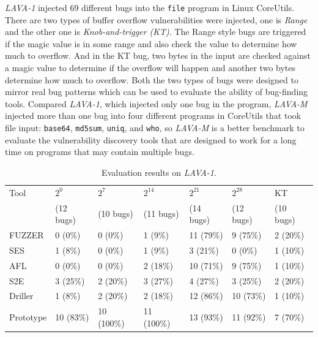 \textit{LAVA-1} injected 69 different bugs into the \texttt{file} program in Linux CoreUtils. There are two types of buffer overflow vulnerabilities were injected, one is \emph{Range} and the other one is \emph{Knob-and-trigger (KT)}. The Range style bugs are triggered if the magic value is in some range and also check the value to determine how much to overflow. And in the KT bug, two bytes in the input are checked against a magic value to determine if the overflow will happen and another two bytes determine how much to overflow. Both the two types of bugs were designed to mirror real bug patterns which can be used to evaluate the ability of bug-finding tools. Compared \textit{LAVA-1}, which injected only one bug in the program, \textit{LAVA-M} injected more than one bug into four different programs in CoreUtils that took file input: \texttt{base64}, \texttt{md5sum}, \texttt{uniq}, and \texttt{who}, so \textit{LAVA-M} is a better benchmark to evaluate the vulnerability discovery tools that are designed to work for a long time on programs that may contain multiple bugs.

\begin{table}
  \caption{\label{LAVA-1}Evaluation results on \textit{LAVA-1}.}
  \centering
	\begin{tabular}{p{2cm}<{\centering} p{1.5cm}<{\centering} p{1.6cm}<{\centering}  p{1.6cm}<{\centering}	p{1.5cm}<{\centering} p{1.5cm}<{\centering}  p{1.5cm}<{\centering} }
		\toprule
	    Tool & $2^0$ & $2^7$  & $2^{14}$ & $2^{21}$ & $2^{28}$ & KT \\
	         & (12 bugs) & (10 bugs) & (11 bugs) & (14 bugs) & (12 bugs) & (10 bugs) \\
		\midrule
		FUZZER 		& 0 (0\%)   & 0 (0\%)    & 1 (9\%)    & 11 (79\%) & 9 (75\%)  & 2 (20\%) \\
		SES	        & 1 (8\%)   & 0 (0\%)    & 1 (9\%)    & 3 (21\%)  & 0 (0\%)   & 1 (10\%) \\
		AFL		    & 0 (0\%)   & 0 (0\%)    & 2 (18\%)   & 10 (71\%) & 9 (75\%)  & 1 (10\%) \\
		S2E			& 3 (25\%)  & 2 (20\%)   & 3 (27\%)   & 4 (27\%)  & 3 (25\%)  & 2 (20\%) \\
		Driller		& 1 (8\%)   & 2 (20\%)   & 2 (18\%)   & 12 (86\%) & 10 (73\%) & 1 (10\%) \\
		Prototype	& 10 (83\%) & 10 (100\%) & 11 (100\%) & 13 (93\%) & 11 (92\%) & 7 (70\%) \\
	 \bottomrule
	\end{tabular}
\end{table}

